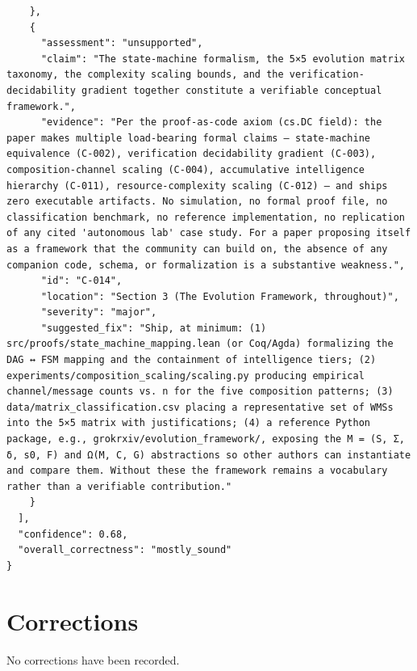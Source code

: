 \documentclass[11pt]{article}
\begin{document}
\begin{verbatim}
    },
    {
      "assessment": "unsupported",
      "claim": "The state-machine formalism, the 5×5 evolution matrix taxonomy, the complexity scaling bounds, and the verification-decidability gradient together constitute a verifiable conceptual framework.",
      "evidence": "Per the proof-as-code axiom (cs.DC field): the paper makes multiple load-bearing formal claims — state-machine equivalence (C-002), verification decidability gradient (C-003), composition-channel scaling (C-004), accumulative intelligence hierarchy (C-011), resource-complexity scaling (C-012) — and ships zero executable artifacts. No simulation, no formal proof file, no classification benchmark, no reference implementation, no replication of any cited 'autonomous lab' case study. For a paper proposing itself as a framework that the community can build on, the absence of any companion code, schema, or formalization is a substantive weakness.",
      "id": "C-014",
      "location": "Section 3 (The Evolution Framework, throughout)",
      "severity": "major",
      "suggested_fix": "Ship, at minimum: (1) src/proofs/state_machine_mapping.lean (or Coq/Agda) formalizing the DAG ↔ FSM mapping and the containment of intelligence tiers; (2) experiments/composition_scaling/scaling.py producing empirical channel/message counts vs. n for the five composition patterns; (3) data/matrix_classification.csv placing a representative set of WMSs into the 5×5 matrix with justifications; (4) a reference Python package, e.g., grokrxiv/evolution_framework/, exposing the M = (S, Σ, δ, s0, F) and Ω(M, C, G) abstractions so other authors can instantiate and compare them. Without these the framework remains a vocabulary rather than a verifiable contribution."
    }
  ],
  "confidence": 0.68,
  "overall_correctness": "mostly_sound"
}
\end{verbatim}

\section*{Corrections}
No corrections have been recorded.
\end{document}
